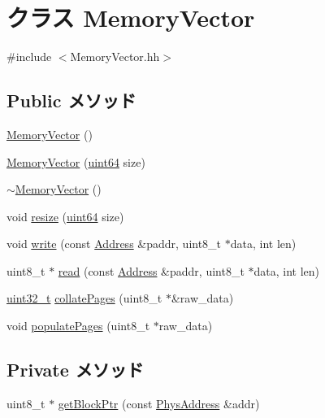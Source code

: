 \hypertarget{classMemoryVector}{
\section{クラス MemoryVector}
\label{classMemoryVector}
}


{\ttfamily \#include $<$MemoryVector.hh$>$}\subsection*{Public メソッド}
\begin{DoxyCompactItemize}
\item 
\hyperlink{classMemoryVector_a0d69cc0d03dd90dec0a42a02f80e6fc3}{MemoryVector} ()
\item 
\hyperlink{classMemoryVector_a8dabb961f3dfab673f3231af344f0c52}{MemoryVector} (\hyperlink{TypeDefines_8hh_a29940ae63ec06c9998bba873e25407ad}{uint64} size)
\item 
\hyperlink{classMemoryVector_adb36a662a886ad8dd3877a5989aacdbc}{$\sim$MemoryVector} ()
\item 
void \hyperlink{classMemoryVector_a6da191301b562078e345bd2b6399a9a1}{resize} (\hyperlink{TypeDefines_8hh_a29940ae63ec06c9998bba873e25407ad}{uint64} size)
\item 
void \hyperlink{classMemoryVector_a8ec391c8b51d1738602ab13bc1d4c78e}{write} (const \hyperlink{classAddress}{Address} \&paddr, uint8\_\-t $\ast$data, int len)
\item 
uint8\_\-t $\ast$ \hyperlink{classMemoryVector_a7752d5bff6be1de2b0e44953b0de5fea}{read} (const \hyperlink{classAddress}{Address} \&paddr, uint8\_\-t $\ast$data, int len)
\item 
\hyperlink{Type_8hh_a435d1572bf3f880d55459d9805097f62}{uint32\_\-t} \hyperlink{classMemoryVector_a8b98a578a2b3755a5a07c42ff4475c24}{collatePages} (uint8\_\-t $\ast$\&raw\_\-data)
\item 
void \hyperlink{classMemoryVector_a7e181ccf8a5d687b45d21ec056af0897}{populatePages} (uint8\_\-t $\ast$raw\_\-data)
\end{DoxyCompactItemize}
\subsection*{Private メソッド}
\begin{DoxyCompactItemize}
\item 
uint8\_\-t $\ast$ \hyperlink{classMemoryVector_aa84e71fe0f01161f74d3430956f10390}{getBlockPtr} (const \hyperlink{classAddress}{PhysAddress} \&addr)
\end{DoxyCompactItemize}

